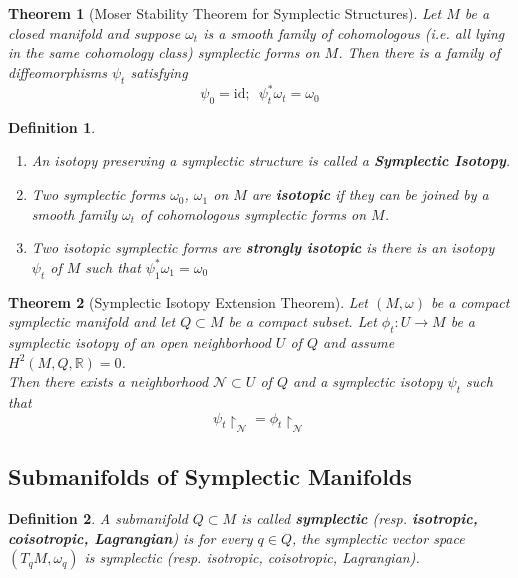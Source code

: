 \documentclass{article}
\newtheorem{thm}{Theorem}
\newtheorem{defn}{Definition}
\begin{document}
\begin{thm}[Moser Stability Theorem for Symplectic Structures]
Let $M$ be a closed manifold and suppose $\omega_t$ is a smooth family of cohomologous (i.e. all lying in the same cohomology class) symplectic forms on $M$. Then there is a family of diffeomorphisms $\psi_t$ satisfying
\begin{equation}
    \psi_0 = \mathrm{id}; \hspace{6pt} \psi_t^*\omega_t = \omega_0
\end{equation}
\end{thm}

\begin{defn}
\begin{enumerate}
    \item An isotopy preserving a symplectic structure is called a \textbf{Symplectic Isotopy}.
    \item Two symplectic forms $\omega_0$, $\omega_1$ on $M$ are \textbf{isotopic} if they can be joined by a smooth family $\omega_t$ of cohomologous symplectic forms on $M$.
    \item Two isotopic symplectic forms are \textbf{strongly isotopic} is there is an isotopy $\psi_t$ of $M$ such that $\psi_1^* \omega_1 =\omega_0$
\end{enumerate}
\end{defn}

\begin{thm}[Symplectic Isotopy Extension Theorem]
Let $(M,\omega)$ be a compact symplectic manifold and let $Q \subset M$ be a compact subset. Let $\phi_t: U \to M$ be a symplectic isotopy of an open neighborhood $U$ of $Q$ and assume $H^2(M,Q,\mathbb{R})=0$. \\
\indent Then there exists a neighborhood $\mathcal{N} \subset U$ of $Q$ and a symplectic isotopy $\psi_t$ such that
\begin{equation}
    \psi_t \restriction_{\mathcal{N}} = \phi_t \restriction_{\mathcal{N}}
\end{equation}
\end{thm}

\subsection{Submanifolds of Symplectic Manifolds}

\begin{defn}
A submanifold $Q \subset M$ is called \textbf{symplectic} (resp. \textbf{isotropic, coisotropic, Lagrangian}) is for every $q \in Q$, the symplectic vector space $(T_qM, \omega_q)$ is symplectic (resp. isotropic, coisotropic, Lagrangian).
\end{defn}
\end{document}
